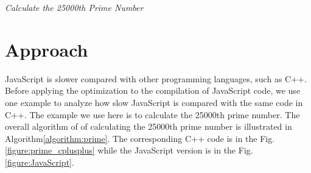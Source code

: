 \documentclass[conference]{IEEEtran}
\begin{document}
\begin{algorithm}[hbt!]
\caption{\scriptsize{\emph{Calculate the 25000th Prime Number}}}
 \label{algorithm:prime}
 \begin{algorithmic}[1]
 \begin{scriptsize}
 \REQUIRE {}
        \ENDIF
    \ENDFOR
        \ENDIF
     \ENDIF
\end{scriptsize}
\end{algorithmic}
\end{algorithm}
\section{Approach}
JavaScript is slower compared with other programming languages, such as C++. Before applying the optimization to the compilation of JavaScript code, we use one example to analyze how slow JavaScript is compared with the same code in C++. The example we use here is to calculate the 25000th prime number\cite{google_IO}. The overall algorithm of of calculating the 25000th prime number is illustrated in Algorithm\ref{algorithm:prime}.
The corresponding C++ code is in the Fig.\ref{figure:prime_cplusplus} while the JavaScript version is in the Fig.\ref{figure:JavaScript}.
\end{document}
